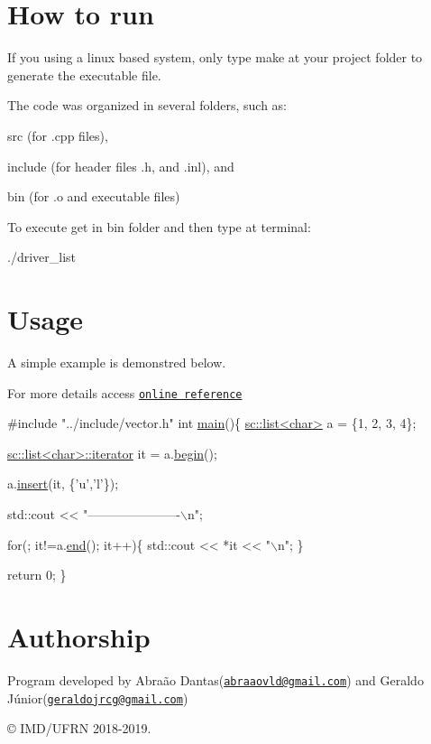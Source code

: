 \section*{How to run}

If you using a linux based system, only type {\ttfamily make} at your project folder to generate the executable file.

The code was organized in several folders, such as\+:
\begin{DoxyItemize}
\item src (for .cpp files),
\item include (for header files .h, and .inl), and
\item bin (for .o and executable files)
\end{DoxyItemize}

To execute get in bin folder and then type at terminal\+:

{\ttfamily ./driver\+\_\+list}

\section*{Usage}

A simple example is demonstred below.

For more details access \href{http://en.cppreference.com/w/cpp/container/list}{\tt online reference}


\begin{DoxyCode}
\textcolor{preprocessor}{#include "../include/vector.h"}
\textcolor{keywordtype}{int} \mbox{\hyperlink{driver__list_8cpp_ae66f6b31b5ad750f1fe042a706a4e3d4}{main}}()\{
    \mbox{\hyperlink{classsc_1_1list}{sc::list<char>}} a = \{1, 2, 3, 4\};

    \mbox{\hyperlink{classsc_1_1list_1_1iterator}{sc::list<char>::iterator}} it = a.\mbox{\hyperlink{classsc_1_1list_a5f5e6470de04a47d530dae0c87403caa}{begin}}();

    a.\mbox{\hyperlink{classsc_1_1list_a633565e547a05308a6f527a0aac716f8}{insert}}(it, \{\textcolor{charliteral}{'u'},\textcolor{charliteral}{'l'}\});


    std::cout << \textcolor{stringliteral}{"----------------------\(\backslash\)n"};

    \textcolor{keywordflow}{for}(; it!=a.\mbox{\hyperlink{classsc_1_1list_a31c42556b18886277d436ec540019349}{end}}(); it++)\{
            std::cout << *it << \textcolor{stringliteral}{"\(\backslash\)n"};
    \}

    \textcolor{keywordflow}{return} 0;
\}
\end{DoxyCode}


\section*{Authorship}

Program developed by Abraão Dantas(\href{mailto:abraaovld@gmail.com}{\tt abraaovld@gmail.\+com}) and Geraldo Júnior(\href{mailto:geraldojrcg@gmail.com}{\tt geraldojrcg@gmail.\+com})

\copyright{} I\+M\+D/\+U\+F\+RN 2018-\/2019. 